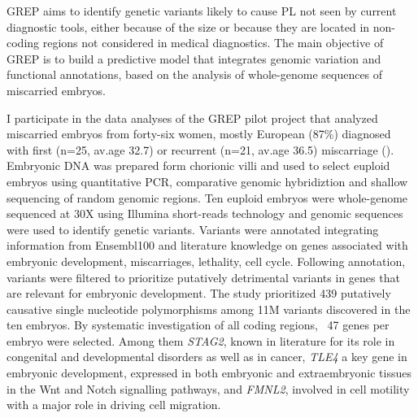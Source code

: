 GREP aims to identify genetic variants likely to cause PL not seen by current diagnostic tools, either because of the size or because they are located in non-coding regions not considered in medical diagnostics. The main objective of GREP is to build a predictive model that integrates genomic variation and functional annotations, based on the analysis of whole-genome sequences of miscarried embryos.

I participate in the data analyses of the GREP pilot project that
analyzed miscarried embryos from forty-six women, mostly European
(87\%) diagnosed with first (n=25, av.age 32.7) or recurrent
(n=21, av.age 36.5) miscarriage
(\cite{buonaiuto2021prioritization}). Embryonic DNA was prepared
form chorionic villi and used to select euploid embryos using
quantitative PCR, comparative genomic hybridiztion and shallow
sequencing of random genomic regions. Ten euploid embryos were
whole-genome sequenced at 30X using Illumina short-reads
technology and genomic sequences were used to identify genetic
variants. Variants were annotated integrating information from
Ensembl100 and literature knowledge on genes associated with
embryonic development, miscarriages, lethality, cell cycle.
Following annotation, variants were filtered to prioritize
putatively detrimental variants in genes that are relevant for
embryonic development. The study prioritized 439 putatively
causative single nucleotide polymorphisms among 11M variants
discovered in the ten embryos. By systematic investigation of all
coding regions, ~47 genes per embryo were selected. Among them
\textit{STAG2}, known in literature for its role in congenital and
developmental disorders as well as in cancer, \textit{TLE4} a key
gene in embryonic development, expressed in both embryonic and
extraembryonic tissues in the Wnt and Notch signalling pathways,
and \textit{FMNL2}, involved in cell motility with a major role in
driving cell migration.












